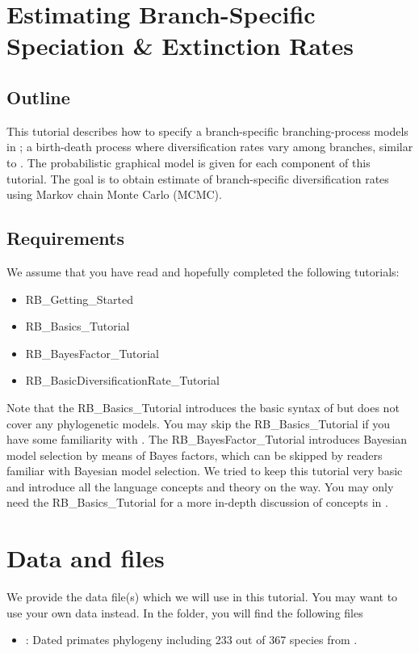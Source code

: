 \section{Estimating Branch-Specific Speciation \& Extinction Rates}

\subsection{Outline}

This tutorial describes how to specify a branch-specific branching-process models in \RevBayes;
a birth-death process where diversification rates vary among branches, similar to \cite{Rabosky2014a}.
The probabilistic graphical model is given for each component of this tutorial.
The goal is to obtain estimate of branch-specific diversification rates using Markov chain Monte Carlo (MCMC).


\subsection{Requirements}
We assume that you have read and hopefully completed the following tutorials:
\begin{itemize}
\item RB\_Getting\_Started
\item RB\_Basics\_Tutorial
\item RB\_BayesFactor\_Tutorial
\item RB\_BasicDiversificationRate\_Tutorial
\end{itemize}
Note that the RB\_Basics\_Tutorial introduces the basic syntax of \Rev but does not cover any phylogenetic models.
You may skip the RB\_Basics\_Tutorial if you have some familiarity with \R.
The RB\_BayesFactor\_Tutorial introduces Bayesian model selection by means of Bayes factors, which can be skipped by readers familiar with Bayesian model selection.
We tried to keep this tutorial very basic and introduce all the language concepts and theory on the way.
You may only need the RB\_Basics\_Tutorial for a more in-depth discussion of concepts in \Rev.



\section{Data and files}

We provide the data file(s) which we will use in this tutorial.
You may want to use your own data instead.
In the  folder, you will find the following files
\begin{itemize}
\item {}: Dated primates phylogeny including 233 out of 367 species from \cite{MagnusonFord2012}.
\end{itemize}


